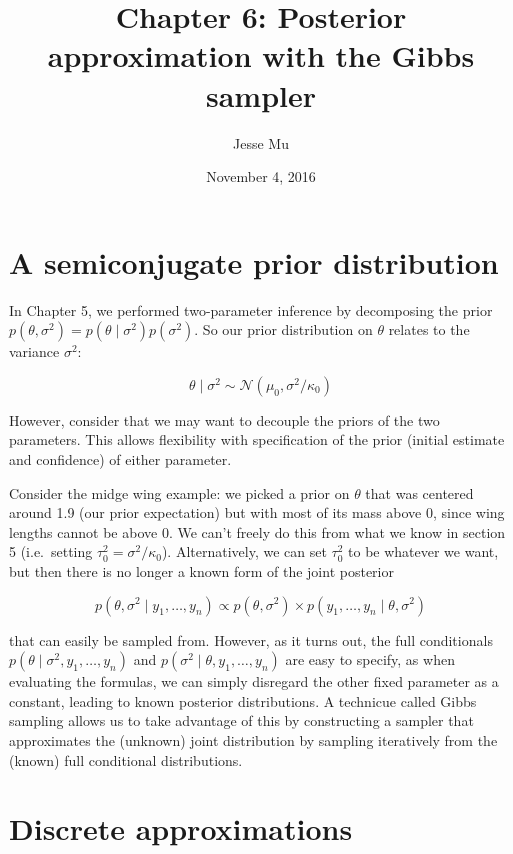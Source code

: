 \documentclass[]{article}
\title{Chapter 6: Posterior approximation with the Gibbs sampler}
\author{Jesse Mu}
\date{November 4, 2016}
\begin{document}
\maketitle

{
\setcounter{tocdepth}{2}
\tableofcontents
}
\hypertarget{a-semiconjugate-prior-distribution}{%
\section{A semiconjugate prior
distribution}\label{a-semiconjugate-prior-distribution}}

In Chapter 5, we performed two-parameter inference by decomposing the
prior \(p(\theta, \sigma^2) = p(\theta \mid \sigma^2) p(\sigma^2)\). So
our prior distribution on \(\theta\) relates to the variance
\(\sigma^2\):

\[
\theta \mid \sigma^2 \sim \mathcal{N}(\mu_0, \sigma^2 / \kappa_0)
\]

However, consider that we may want to decouple the priors of the two
parameters. This allows flexibility with specification of the prior
(initial estimate and confidence) of either parameter.

Consider the midge wing example: we picked a prior on \(\theta\) that
was centered around 1.9 (our prior expectation) but with most of its
mass above 0, since wing lengths cannot be above 0. We can't freely do
this from what we know in section 5 (i.e.~setting
\(\tau_0^2 = \sigma^2 / \kappa_0\)). Alternatively, we can set
\(\tau_0^2\) to be whatever we want, but then there is no longer a known
form of the joint posterior

\[
p(\theta, \sigma^2 \mid y_1, \dots, y_n) \propto p(\theta, \sigma^2) \times p(y_1, \dots, y_n \mid \theta, \sigma^2)
\]

that can easily be sampled from. However, as it turns out, the full
conditionals \(p(\theta \mid \sigma^2, y_1, \dots, y_n)\) and
\(p(\sigma^2 \mid \theta, y_1, \dots, y_n)\) are easy to specify, as
when evaluating the formulas, we can simply disregard the other fixed
parameter as a constant, leading to known posterior distributions. A
technicue called Gibbs sampling allows us to take advantage of this by
constructing a sampler that approximates the (unknown) joint
distribution by sampling iteratively from the (known) full conditional
distributions.

\hypertarget{discrete-approximations}{%
\section{Discrete approximations}\label{discrete-approximations}}
\end{document}

